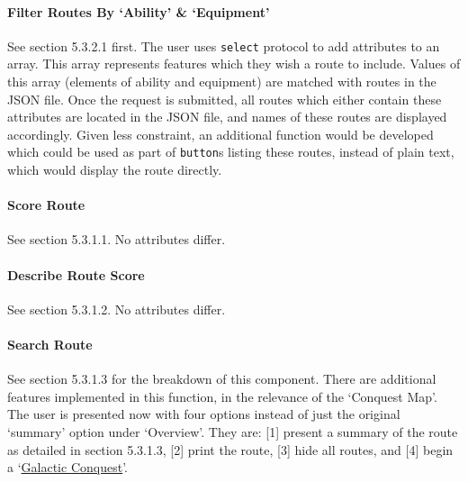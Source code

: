 \documentclass[11pt, english]{article}
\begin{document}
			\paragraph{Filter Routes By `Ability' \& `Equipment'}

	See section 5.3.2.1 first. The user uses \texttt{select} protocol to add attributes to an array.  This array represents features which they wish a route to include. Values of this array (elements of ability and equipment) are matched with routes in the JSON file. Once the request is submitted, all routes which either contain these attributes are located in the JSON file, and names of these routes are displayed accordingly. Given less constraint, an additional function would be developed which could be used as part of \texttt{button}s listing these routes, instead of plain text, which would display the route directly.

			\paragraph{Score Route}

	See section 5.3.1.1. No attributes differ.

			\paragraph{Describe Route Score}

	See section 5.3.1.2. No attributes differ.

			\paragraph{Search Route}

	See section 5.3.1.3 for the breakdown of this component. There are additional features implemented in this function, in the relevance of the `Conquest Map'. The user is presented now with four options instead of just the original `summary' option under `Overview'. They are: [1] present a summary of the route as detailed in section 5.3.1.3, [2] print the route, [3] hide all routes, and [4] begin a `\href{https://www.youtube.com/watch?v=IvaldKgWGHo}{Galactic Conquest}'.\\
\end{document}
